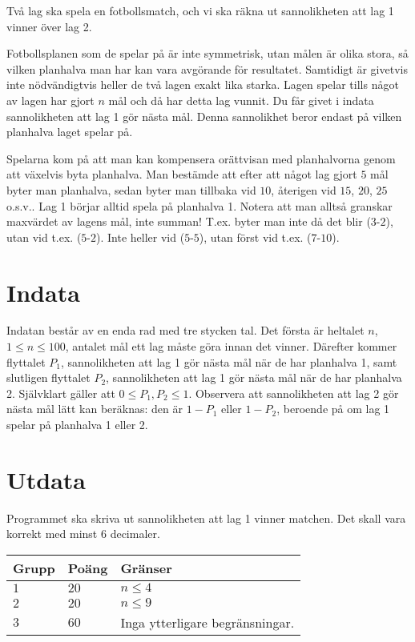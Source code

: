 
Två lag ska spela en fotbollsmatch, och vi ska räkna ut sannolikheten att lag 1 vinner över lag 2.

Fotbollsplanen som de spelar på är inte symmetrisk, utan målen är olika stora, så vilken planhalva man har kan vara avgörande för resultatet. Samtidigt är givetvis inte nödvändigtvis heller de två lagen exakt lika starka. Lagen spelar tills något av lagen har gjort $n$ mål och då har detta lag vunnit. Du får givet i indata sannolikheten att lag 1 gör nästa mål. Denna sannolikhet beror endast på vilken planhalva laget spelar på.

Spelarna kom på att man kan kompensera orättvisan med planhalvorna genom att växelvis byta planhalva. Man bestämde att efter att något lag gjort $5$ mål byter man planhalva, sedan byter man tillbaka vid $10$, återigen vid $15$, $20$, $25$ o.s.v.. Lag 1 börjar alltid spela på planhalva 1. Notera att man alltså granskar maxvärdet av lagens mål, inte summan! T.ex. byter man inte då det blir ($3$-$2$), utan vid t.ex. ($5$-$2$). Inte heller vid ($5$-$5$), utan först vid t.ex. ($7$-$10$).

\section*{Indata}
Indatan består av en enda rad med tre stycken tal. Det första är heltalet $n$, $1 \leq n \leq 100$, antalet mål ett lag måste göra innan det vinner. Därefter kommer flyttalet $P_1$, sannolikheten att lag 1 gör nästa mål när de har planhalva 1, samt slutligen flyttalet $P_2$, sannolikheten att lag 1 gör nästa mål när de har planhalva 2. Självklart gäller att $0 \leq P_1, P_2 \leq 1$. Observera att sannolikheten att lag 2 gör nästa mål lätt kan beräknas: den är $1 - P_1$ eller $1 - P_2$, beroende på om lag 1 spelar på planhalva 1 eller 2.

\section*{Utdata}
Programmet ska skriva ut sannolikheten att lag 1 vinner matchen. Det skall vara korrekt med minst $6$ decimaler.

\noindent
\begin{tabular}{| l | l | p{12cm} |}
  \hline
  \textbf{Grupp} & \textbf{Poäng} & \textbf{Gränser} \\ \hline
  $1$    & $20$          & $n \leq 4$  \\ \hline
  $2$    & $20$          & $n \leq 9$  \\ \hline
  $3$    & $60$          & Inga ytterligare begränsningar.  \\ \hline
\end{tabular}
